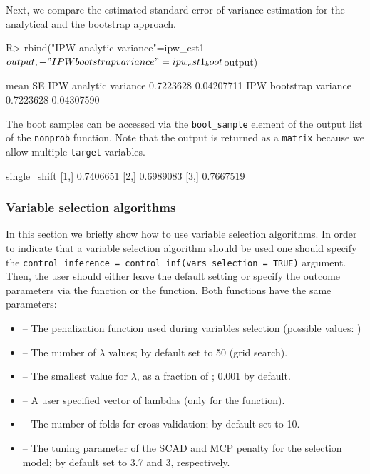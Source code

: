\documentclass[
]{jss}
\begin{document}
Next, we compare the estimated standard error of variance estimation for
the analytical and the bootstrap approach.

\begin{CodeChunk}
\begin{CodeInput}
R> rbind("IPW analytic variance"=ipw_est1$output,
+       "IPW bootstrap variance"=ipw_est1_boot$output)
\end{CodeInput}
\begin{CodeOutput}
                            mean         SE
IPW analytic variance  0.7223628 0.04207711
IPW bootstrap variance 0.7223628 0.04307590
\end{CodeOutput}
\end{CodeChunk}

The boot samples can be accessed via the \texttt{boot\_sample} element
of the output list of the \texttt{nonprob} function. Note that the
output is returned as a \texttt{matrix} because we allow multiple
\texttt{target} variables.

\begin{CodeChunk}
\begin{CodeOutput}
     single_shift
[1,]    0.7406651
[2,]    0.6989083
[3,]    0.7667519
\end{CodeOutput}
\end{CodeChunk}

\subsubsection{Variable selection
algorithms}\label{variable-selection-algorithms}

In this section we briefly show how to use variable selection
algorithms. In order to indicate that a variable selection algorithm
should be used one should specify the
\texttt{control\_inference\ =\ control\_inf(vars\_selection\ =\ TRUE)}
argument. Then, the user should either leave the default setting or
specify the outcome parameters via the  function or
the  function. Both functions have the same
parameters:

\begin{itemize}
\item {} -- The penalization function used during variables selection (possible values: )
\item {} -- The number of $\lambda$ values; by default set to 50 (grid search).
\item {} -- The smallest value for $\lambda$, as a fraction of ; 0.001 by default.
\item {} -- A user specified vector of lambdas (only for the  function).
\item {} -- The number of folds for cross validation; by default set to 10.
\item {} -- The tuning parameter of the SCAD and MCP penalty for the selection model; by default set to 3.7 and 3, respectively.
\end{itemize}
\end{document}
